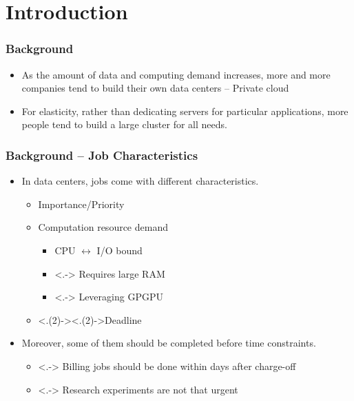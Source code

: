 \section{Introduction}

\begin{frame}
  \frametitle{Background}
  \begin{itemize}[<+->]
    \item As the amount of data and computing demand increases, more and
      more companies tend to build their own data centers -- Private cloud
    \item For elasticity, rather than dedicating servers for particular
      applications, more people tend to build a large cluster for all
      needs.
  \end{itemize}
\end{frame}

\begin{frame}
  \frametitle{Background -- Job Characteristics}
  \begin{itemize}[<+->]
    \item In data centers, jobs come with different characteristics.
      \begin{itemize}
        \item Importance/Priority
        \item Computation resource demand
          \begin{itemize}
            \item CPU $\leftrightarrow$ I/O bound
            \item <.-> Requires large RAM
            \item <.-> Leveraging GPGPU
          \end{itemize}
        \item <.(2)->{\alert<.(2)->{Deadline}}
      \end{itemize}
    \item Moreover, some of them should be completed before time
      constraints.
      \begin{itemize}
        \item <.-> Billing jobs should be done within days after charge-off
        \item <.-> Research experiments are not that urgent
      \end{itemize}
  \end{itemize}
\end{frame}

